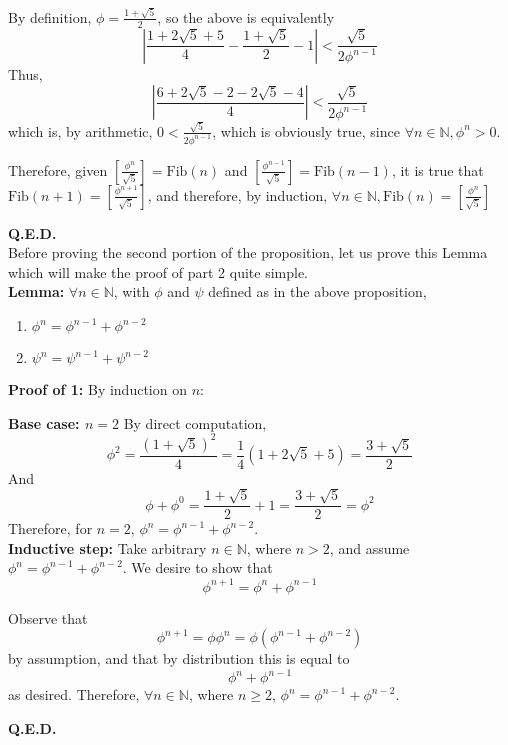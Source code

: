 \documentclass{article}
\begin{document}
By definition, $ \phi = \frac{1+\sqrt{5}}{2} $, so the above is equivalently
$$ |\frac{1 + 2\sqrt{5} + 5}{4} - \frac{1 + \sqrt{5}}{2} - 1| < \frac{\sqrt{5}}{2\phi^{n-1}} $$
Thus, $$ |\frac{6 + 2\sqrt{5} - 2 - 2\sqrt{5} - 4}{4}| < \frac{\sqrt{5}}{2\phi^{n-1}} $$
which is, by arithmetic, $ 0 < \frac{\sqrt{5}}{2\phi^{n-1}} $, which is obviously true, since $ \forall n \in \mathbb{N}, \phi^n > 0 $.

Therefore, given $ [\frac{\phi^n}{\sqrt{5}}] = \text{Fib}(n) $ and $ [\frac{\phi^{n-1}}{\sqrt{5}}] = \text{Fib}(n-1) $, it is true that $ \text{Fib}(n + 1) = [\frac{\phi^{n+1}}{\sqrt{5}}] $, and therefore, by induction, $\forall n \in \mathbb{N}, \text{Fib}(n) = [\frac{\phi^n}{\sqrt{5}}]$

\hfill \textbf{Q.E.D.} \\

Before proving the second portion of the proposition, let us prove this Lemma which will make the proof of part 2 quite simple. \\


\noindent
\textbf{Lemma:} $ \forall n \in \mathbb{N} $, with $\phi$ and $\psi$ defined as in the above proposition,
\begin{enumerate}
    \item $ \phi^n = \phi^{n-1} + \phi^{n-2} $
    \item $ \psi^n = \psi^{n-1} + \psi^{n-2} $
\end{enumerate}


\noindent
\textbf{Proof of 1:} By induction on $ n $:

\textbf{Base case: $n = 2$} By direct computation,
$$ \phi^2 = \frac{(1+\sqrt{5})^2}{4} = \frac{1}{4}(1+2\sqrt{5}+5) = \frac{3 + \sqrt{5}}{2} $$
And $$ \phi + \phi^0 = \frac{1+\sqrt{5}}{2} + 1 = \frac{3 + \sqrt{5}}{2} = \phi^2 $$
Therefore, for $ n = 2 $, $ \phi^n = \phi^{n - 1} + \phi^{n - 2} $. \\

\textbf{Inductive step:} Take arbitrary $ n \in \mathbb{N} $, where $ n > 2 $, and assume $ \phi^n = \phi^{n - 1} + \phi^{n - 2} $. We desire to show that $$ \phi^{n + 1} = \phi^n + \phi^{n - 1} $$

Observe that $$ \phi^{n + 1} = \phi\phi^n = \phi(\phi^{n - 1} + \phi^{n - 2}) $$ by assumption, and that by distribution this is equal to $$ \phi^n + \phi^{n - 1} $$ as desired.
Therefore, $ \forall n \in \mathbb{N} $, where $ n \geq 2 $, $ \phi^n = \phi^{n - 1} + \phi^{n - 2} $.

\hfill \textbf{Q.E.D.} \\
\end{document}
